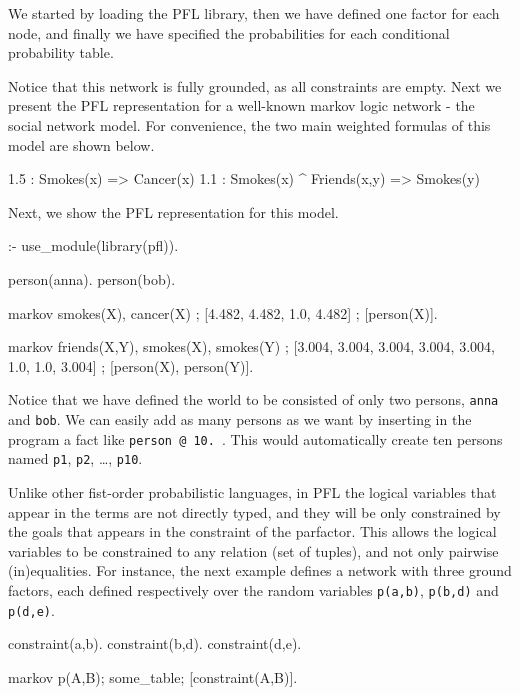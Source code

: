\documentclass{article}
\begin{document}
We started by loading the PFL library, then we have defined one factor for each node, and finally we have specified the probabilities for each conditional probability table.

Notice that this network is fully grounded, as all constraints are empty. Next we present the PFL representation for a well-known markov logic network - the social network model. For convenience, the two main weighted formulas of this model are shown below.

\begin{pflcode}
1.5 : Smokes(x) => Cancer(x)
1.1 : Smokes(x) ^ Friends(x,y) => Smokes(y)
\end{pflcode}

Next, we show the PFL representation for this model.

\begin{pflcode}
:- use_module(library(pfl)).

person(anna).
person(bob).

markov smokes(X), cancer(X) ;
    [4.482, 4.482, 1.0, 4.482] ;
    [person(X)].

markov friends(X,Y), smokes(X), smokes(Y) ;
    [3.004, 3.004, 3.004, 3.004, 3.004, 1.0, 1.0, 3.004] ;
    [person(X), person(Y)].
\end{pflcode}

Notice that we have defined the world to be consisted of only two persons, \texttt{anna} and \texttt{bob}. We can easily add as many persons as we want by inserting in the program a fact like \texttt{person @ 10.}~. This would automatically create ten persons named \texttt{p1}, \texttt{p2}, \dots, \texttt{p10}.

Unlike other fist-order probabilistic languages, in PFL the logical variables that appear in the terms are not directly typed, and they will be only constrained by the goals that appears in the constraint of the parfactor. This allows the logical variables to be constrained to any relation (set of tuples), and not only pairwise (in)equalities. For instance, the next example defines a network with three ground factors, each defined respectively over the random variables \texttt{p(a,b)}, \texttt{p(b,d)} and \texttt{p(d,e)}.

\begin{pflcode}
constraint(a,b).
constraint(b,d).
constraint(d,e).

markov p(A,B); some_table; [constraint(A,B)].
\end{pflcode}
\end{document}
